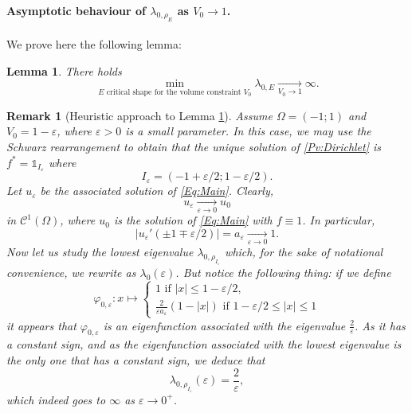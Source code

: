 \documentclass{article}
\renewcommand{\leq}{\leqslant}
\def\e{{\varepsilon}}
\newtheorem{lemma}[material]{Lemma}
\newtheorem{remark}[material]{Remark}
\def\O{{\Omega}}
\def\p{{\varphi}}
\numberwithin{equation}{section}
\begin{document}
\paragraph{Asymptotic behaviour of $\lambda_{0,\rho_E}$ as $V_0\to 1$.}
We prove here the following lemma:
\begin{lemma}\label{Le:EigenvalueBlowup}
There holds \[\min_{E\text{ critical shape for the volume constraint $V_0$}}\lambda_{0,E}\underset{V_0\to 1}\rightarrow \infty.\]
\end{lemma}
\begin{remark}[Heuristic approach to Lemma \ref{Le:EigenvalueBlowup}]Assume $\O=(-1;1)$ and $V_0=1-\e$, where $\e>0$ is a small parameter. In this case, we may use the Schwarz rearrangement to obtain that the unique solution of \eqref{Pv:Dirichlet} is $f^*=\mathds1_{I_\e}$ where 
\[ I_\e=(-1+\e/2;1-\e/2).\] Let $u_\e$ be the associated solution of \eqref{Eq:Main}. Clearly, 
\[u_\e\underset{\e \to 0}\rightarrow u_0\] in $\mathscr C^1(\O)$, where $u_0$ is the solution of \eqref{Eq:Main} with $f\equiv 1$. In particular, 
\[ |u_\e'(\pm 1\mp\e/2)|=a_\e\underset{\e\to 0}\rightarrow1.\]
Now let us study the lowest eigenvalue $\lambda_{0,\rho_{I_\e}}$ which, for the sake of notational convenience, we rewrite as $\lambda_0(\e)$. But notice the following thing: if we define 
\[ \p_{0,\e}:x\mapsto \begin{cases}1\text{ if }|x|\leq 1-\e/2,
\\ \frac{2}{\e a_\e} (1-|x|) \text{ if } 1-\e/2\leq |x|\leq 1
\end{cases}\]
it appears that $\p_{0,\e}$ is an eigenfunction associated with the eigenvalue $\frac2\e$. As it has a constant sign, and as the eigenfunction associated with the lowest eigenvalue is the only one that has a constant sign, we deduce that 
\[ \lambda_{0,\rho_{I_\e}}(\e)=\frac{2}\e,\]
which indeed goes to $\infty$ as $\e\to 0^+$.


\end{remark}
\end{document}
